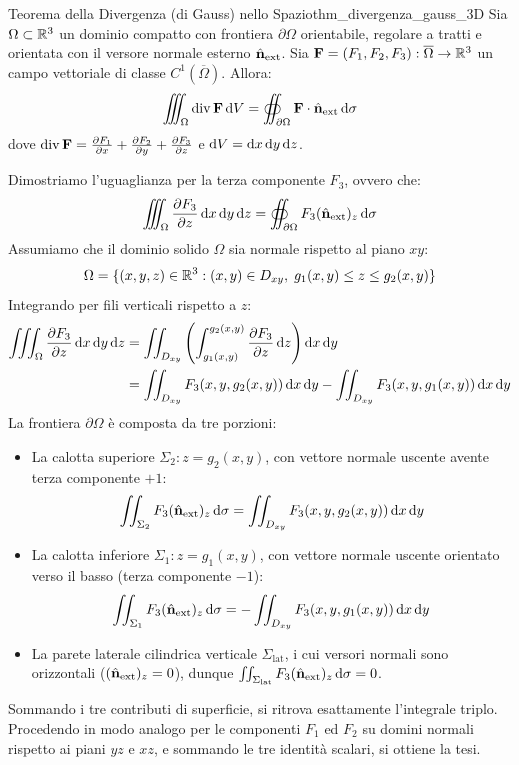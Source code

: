 \begin{teorema}{Teorema della Divergenza (di Gauss) nello Spazio}{thm_divergenza_gauss_3D}
Sia $\Omega \subset \mathbb{R}^3$ un dominio compatto con frontiera $\partial \Omega$ orientabile, regolare a tratti e orientata con il versore normale esterno $\hat{\mathbf{n}}_{\text{ext}}$.
Sia $\mathbf{F} = (F_1, F_2, F_3): \overline{\Omega} \to \mathbb{R}^3$ un campo vettoriale di classe $C^1(\overline{\Omega})$. Allora:
\[
\iiint_\Omega \operatorname{div} \mathbf{F} \mathop{}\!\mathrm{d} V = \oiint_{\partial \Omega} \mathbf{F} \cdot \hat{\mathbf{n}}_{\text{ext}} \mathop{}\!\mathrm{d}\sigma
\]
dove $\operatorname{div} \mathbf{F} = \frac{\partial F_1}{\partial x} + \frac{\partial F_2}{\partial y} + \frac{\partial F_3}{\partial z}$ e $\mathop{}\!\mathrm{d} V = \mathop{}\!\mathrm{d} x\mathop{}\!\mathrm{d} y\mathop{}\!\mathrm{d} z$.
\end{teorema}

\begin{dimostrazione}
Dimostriamo l'uguaglianza per la terza componente $F_3$, ovvero che:
\[
\iiint_\Omega \frac{\partial F_3}{\partial z} \mathop{}\!\mathrm{d} x\mathop{}\!\mathrm{d} y\mathop{}\!\mathrm{d} z = \oiint_{\partial \Omega} F_3 (\hat{\mathbf{n}}_{\text{ext}})_z \mathop{}\!\mathrm{d}\sigma
\]
Assumiamo che il dominio solido $\Omega$ sia normale rispetto al piano $xy$:
\[
\Omega = \{(x,y,z) \in \mathbb{R}^3 : (x,y) \in D_{xy}, \; g_1(x,y) \le z \le g_2(x,y)\}
\]
Integrando per fili verticali rispetto a $z$:
\begin{align*}
\iiint_\Omega \pder{F_3}{z} \dx\dy\dz &= \iint_{D_{xy}} \left( \int_{g_1(x,y)}^{g_2(x,y)} \pder{F_3}{z} \dz \right) \dx\dy \\
&= \iint_{D_{xy}} F_3(x, y, g_2(x,y)) \dx\dy - \iint_{D_{xy}} F_3(x, y, g_1(x,y)) \dx\dy
\end{align*}
La frontiera $\partial \Omega$ è composta da tre porzioni:
\begin{itemize}
    \item La calotta superiore $\Sigma_2: z = g_2(x,y)$, con vettore normale uscente avente terza componente $+1$:
    \[
    \iint_{\Sigma_2} F_3 (\hat{\mathbf{n}}_{\text{ext}})_z \mathop{}\!\mathrm{d}\sigma = \iint_{D_{xy}} F_3(x, y, g_2(x,y)) \mathop{}\!\mathrm{d} x\mathop{}\!\mathrm{d} y
    \]
    \item La calotta inferiore $\Sigma_1: z = g_1(x,y)$, con vettore normale uscente orientato verso il basso (terza componente $-1$):
    \[
    \iint_{\Sigma_1} F_3 (\hat{\mathbf{n}}_{\text{ext}})_z \mathop{}\!\mathrm{d}\sigma = -\iint_{D_{xy}} F_3(x, y, g_1(x,y)) \mathop{}\!\mathrm{d} x\mathop{}\!\mathrm{d} y
    \]
    \item La parete laterale cilindrica verticale $\Sigma_{\text{lat}}$, i cui versori normali sono orizzontali ($(\hat{\mathbf{n}}_{\text{ext}})_z = 0$), dunque $\iint_{\Sigma_{\text{lat}}} F_3 (\hat{\mathbf{n}}_{\text{ext}})_z \mathop{}\!\mathrm{d}\sigma = 0$.
\end{itemize}
Sommando i tre contributi di superficie, si ritrova esattamente l'integrale triplo. Procedendo in modo analogo per le componenti $F_1$ ed $F_2$ su domini normali rispetto ai piani $yz$ e $xz$, e sommando le tre identità scalari, si ottiene la tesi.
\end{dimostrazione}

